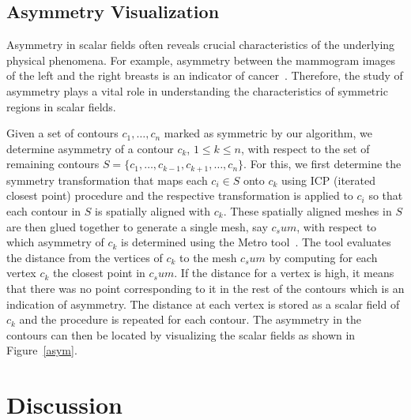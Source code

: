 \documentclass[review,journal]{vgtc}         %
\begin{document}
\subsection{Asymmetry Visualization}
Asymmetry in scalar fields often reveals crucial characteristics of the underlying
physical phenomena. For example, asymmetry between the mammogram images
of the left and the right breasts is an indicator of cancer~\cite{tahmoush2007improved}.
Therefore, the study of asymmetry plays a vital role in understanding the characteristics of
symmetric regions in scalar fields. 

Given a set of contours $c_1,\dots,c_n$ marked as symmetric
by our algorithm, we determine asymmetry of a contour $c_k$, $1 \leq k \leq n$, with
respect to the set of remaining contours $S = \{c_1, \dots, c_{k-1}, c_{k+1}, \dots, c_n\}$.
For this, we first determine the symmetry transformation that maps each $c_i \in S$ onto
$c_k$ using ICP (iterated closest point) procedure and the respective transformation is applied
to $c_i$ so that each contour in $S$ is spatially aligned with $c_k$. These spatially
aligned meshes in $S$ are then glued together to generate a single mesh, say $c_sum$, with 
respect to which asymmetry of $c_k$ is determined using the Metro tool~\cite{CigRS98}. The tool
evaluates the distance from the vertices of $c_k$ to the mesh $c_sum$ by computing for each 
vertex $c_k$ the closest point in $c_sum$. If the distance for a vertex is high, it means that there
was no point corresponding to it in the rest of the contours which is an indication of asymmetry.
The distance at each vertex is stored as a scalar field of $c_k$ and the procedure is repeated
for each contour. The asymmetry in the contours can then be located by visualizing the scalar fields
as shown in Figure~\ref{asym}.
\section{Discussion}
\end{document}
